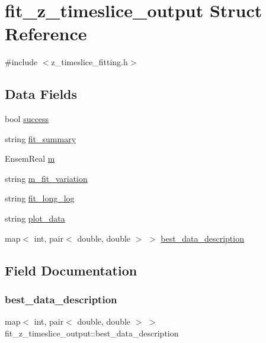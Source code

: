 \hypertarget{structfit__z__timeslice__output}{}\section{fit\+\_\+z\+\_\+timeslice\+\_\+output Struct Reference}
\label{structfit__z__timeslice__output}


{\ttfamily \#include $<$z\+\_\+timeslice\+\_\+fitting.\+h$>$}

\subsection*{Data Fields}
\begin{DoxyCompactItemize}
\item 
bool \mbox{\hyperlink{structfit__z__timeslice__output_af3748e9f9f7c94ef69034e0c480e43ae}{success}}
\item 
string \mbox{\hyperlink{structfit__z__timeslice__output_ae6701e6ab59c3448c7ce8e20a7b09532}{fit\+\_\+summary}}
\item 
Ensem\+Real \mbox{\hyperlink{structfit__z__timeslice__output_a32a381e0a98e1136590f8edb21eaee0b}{m}}
\item 
string \mbox{\hyperlink{structfit__z__timeslice__output_ac9a588c08900e713f8d2cfb25096811b}{m\+\_\+fit\+\_\+variation}}
\item 
string \mbox{\hyperlink{structfit__z__timeslice__output_a249d8d9f70b626f0555728a07a4e8d72}{fit\+\_\+long\+\_\+log}}
\item 
string \mbox{\hyperlink{structfit__z__timeslice__output_aac45ffb693f27884218fbf5bbe2cd560}{plot\+\_\+data}}
\item 
map$<$ int, pair$<$ double, double $>$ $>$ \mbox{\hyperlink{structfit__z__timeslice__output_a758a7f6c62fce8e71a86183f570058bf}{best\+\_\+data\+\_\+description}}
\end{DoxyCompactItemize}


\subsection{Field Documentation}
\mbox{\label{structfit__z__timeslice__output_a758a7f6c62fce8e71a86183f570058bf}} 
\subsubsection{\texorpdfstring{best\_data\_description}{best\_data\_description}}
{\footnotesize\ttfamily map$<$ int, pair$<$ double, double $>$ $>$ fit\+\_\+z\+\_\+timeslice\+\_\+output\+::best\+\_\+data\+\_\+description}

